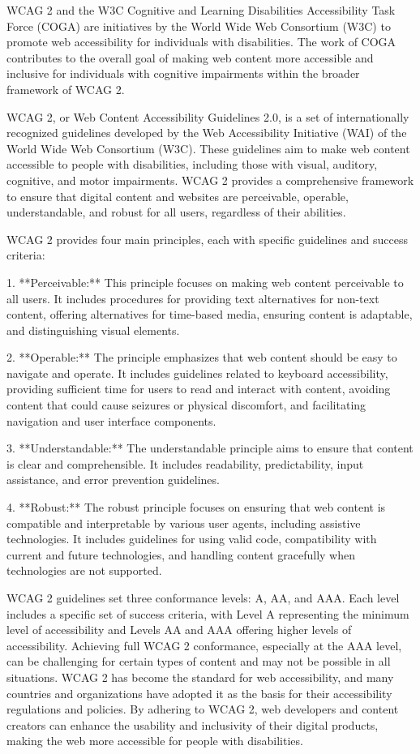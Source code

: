 \documentclass[main.tex]{subfiles}
\begin{document}
WCAG 2 and the W3C Cognitive and Learning Disabilities Accessibility Task Force (COGA) are initiatives by the World Wide Web Consortium (W3C) to promote web accessibility for individuals with disabilities. The work of COGA contributes to the overall goal of making web content more accessible and inclusive for individuals with cognitive impairments within the broader framework of WCAG 2.


WCAG 2, or Web Content Accessibility Guidelines 2.0, is a set of internationally recognized guidelines developed by the Web Accessibility Initiative (WAI) of the World Wide Web Consortium (W3C). These guidelines aim to make web content accessible to people with disabilities, including those with visual, auditory, cognitive, and motor impairments. WCAG 2 provides a comprehensive framework to ensure that digital content and websites are perceivable, operable, understandable, and robust for all users, regardless of their abilities.

WCAG 2 provides four main principles, each with specific guidelines and success criteria:

1. **Perceivable:** This principle focuses on making web content perceivable to all users. It includes procedures for providing text alternatives for non-text content, offering alternatives for time-based media, ensuring content is adaptable, and distinguishing visual elements.

2. **Operable:** The principle emphasizes that web content should be easy to navigate and operate. It includes guidelines related to keyboard accessibility, providing sufficient time for users to read and interact with content, avoiding content that could cause seizures or physical discomfort, and facilitating navigation and user interface components.

3. **Understandable:** The understandable principle aims to ensure that content is clear and comprehensible. It includes readability, predictability, input assistance, and error prevention guidelines.

4. **Robust:** The robust principle focuses on ensuring that web content is compatible and interpretable by various user agents, including assistive technologies. It includes guidelines for using valid code, compatibility with current and future technologies, and handling content gracefully when technologies are not supported.

WCAG 2 guidelines set three conformance levels: A, AA, and AAA. Each level includes a specific set of success criteria, with Level A representing the minimum level of accessibility and Levels AA and AAA offering higher levels of accessibility. Achieving full WCAG 2 conformance, especially at the AAA level, can be challenging for certain types of content and may not be possible in all situations. WCAG 2 has become the standard for web accessibility, and many countries and organizations have adopted it as the basis for their accessibility regulations and policies. By adhering to WCAG 2, web developers and content creators can enhance the usability and inclusivity of their digital products, making the web more accessible for people with disabilities.
\end{document}
